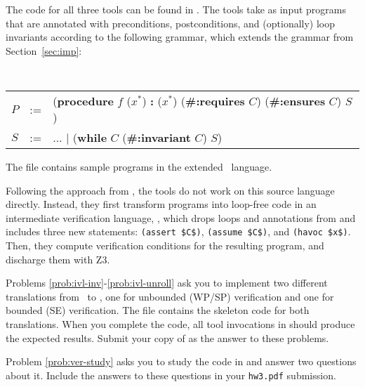 \documentclass{handout}
\begin{document}
The code for all three tools can be found in . The tools
take as input \imp programs that are annotated with preconditions,
postconditions, and (optionally) loop invariants according to the following
grammar, which extends the grammar from Section~\ref{sec:imp}:

{\tt\small
\begin{tabular}{lcl}
$P$ &:=&  (\textbf{procedure} $f$ ($x^*$) \textbf{:} ($x^*$) (\textbf{\#:requires} $C$)  (\textbf{\#:ensures} $C$) $S$) \\
$S$ &:=&  $\ldots$ $|$  (\textbf{while} $C$ (\textbf{\#:invariant} $C$) $S$) \\
\end{tabular}}

The file  contains sample programs in the extended \imp\
language.

Following  the approach from , the tools do not work on this source
language directly. Instead, they first transform \imp programs into loop-free
code in an intermediate verification language, \ivl, which drops loops and
annotations from \imp and includes three new statements: \lstinline{(assert $C$)},
\lstinline{(assume $C$)}, and \lstinline{(havoc $x$)}. Then, they compute
verification conditions for the resulting program, and discharge them with
Z3.\looseness=-1


Problems \ref{prob:ivl-inv}-\ref{prob:ivl-unroll} ask you to implement two
different translations from \imp\ to \ivl, one for unbounded (WP/SP)
verification and one for bounded (SE) verification. The file 
contains the skeleton code for both translations. When you complete the code,
all tool invocations in \src[imp/]{verified.rkt} should produce the expected
results. Submit your copy of \src[imp/]{ivl.rkt} as the answer to these
problems.

Problem \ref{prob:ver-study} asks you to study the code in 
and answer two questions about it. Include the answers to these questions in
your \texttt{hw3.pdf} submission.
\end{document}
